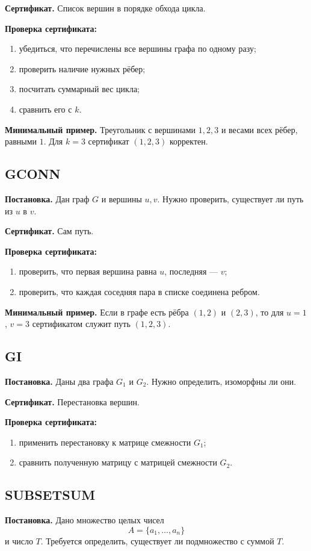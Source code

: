 \documentclass[12pt,a4paper]{article}
\theoremstyle{definition}
\theoremstyle{plain}
\begin{document}
\textbf{Сертификат.} Список вершин в порядке обхода цикла.

\textbf{Проверка сертификата:}
\begin{enumerate}
\item убедиться, что перечислены все вершины графа по одному разу;
\item проверить наличие нужных рёбер;
\item посчитать суммарный вес цикла;
\item сравнить его с $k$.
\end{enumerate}

\textbf{Минимальный пример.}
Треугольник с вершинами $1,2,3$ и весами всех рёбер, равными $1$. Для $k=3$ сертификат $(1,2,3)$ корректен.

\subsection{\textsc{GCONN}}
\textbf{Постановка.} Дан граф $G$ и вершины $u,v$. Нужно проверить, существует ли путь из $u$ в $v$.

\textbf{Сертификат.} Сам путь.

\textbf{Проверка сертификата:}
\begin{enumerate}
\item проверить, что первая вершина равна $u$, последняя --- $v$;
\item проверить, что каждая соседняя пара в списке соединена ребром.
\end{enumerate}

\textbf{Минимальный пример.}
Если в графе есть рёбра $(1,2)$ и $(2,3)$, то для $u=1$, $v=3$ сертификатом служит путь $(1,2,3)$.

\subsection{\textsc{GI}}
\textbf{Постановка.} Даны два графа $G_1$ и $G_2$. Нужно определить, изоморфны ли они.

\textbf{Сертификат.} Перестановка вершин.

\textbf{Проверка сертификата:}
\begin{enumerate}
\item применить перестановку к матрице смежности $G_1$;
\item сравнить полученную матрицу с матрицей смежности $G_2$.
\end{enumerate}

\subsection{\textsc{SUBSETSUM}}
\textbf{Постановка.} Дано множество целых чисел
\[
A=\{a_1,\dots,a_n\}
\]
и число $T$. Требуется определить, существует ли подмножество с суммой $T$.
\end{document}
